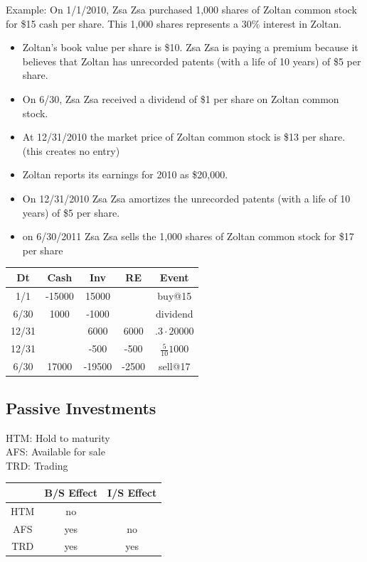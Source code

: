 Example: On 1/1/2010, Zsa Zsa purchased 1,000 shares of Zoltan common stock for \$15
cash per share. This 1,000 shares represents a 30\% interest in Zoltan.
\begin{itemize}[noitemsep,topsep=0pt]
\item Zoltan’s book value per share is \$10. Zsa Zsa is paying a premium because it believes
that Zoltan has unrecorded patents (with a life of 10 years) of \$5 per share.
\item On 6/30, Zsa Zsa received a dividend of \$1 per share on Zoltan common stock.
\item At 12/31/2010 the market price of Zoltan common stock is \$13 per share. (this creates no entry)
\item Zoltan reports its earnings for 2010 as \$20,000.
\item On 12/31/2010 Zsa Zsa amortizes the unrecorded patents (with a life of 10 years) of \$5 per share.
\item on 6/30/2011 Zsa Zsa sells the 1,000 shares of Zoltan common stock for \$17 per share

\end{itemize} 

\newpage

	\begin{tabular}{ |c|c|c||c||c| } 
		\hline
		Dt &  Cash & Inv & RE & Event	 \\ 
		\hline
		1/1   & -15000 & 15000 & & buy@15\\
		6/30  & 1000    & -1000 & & dividend \\
		12/31 &         & 6000  & 6000 & $.3 \cdot 20000$\\ 
		12/31 &         & -500  & -500 & $\frac{5}{10}  1000$ \\    
		6/30 &   17000      & -19500  & -2500 & sell@17 \\      	
		\hline
	\end{tabular}



\subsection*{Passive Investments}

HTM: Hold to maturity \\
AFS: Available for sale \\
TRD: Trading \\
\begin{center}
	\begin{tabular}{ |c|c|c| } 
		\hline
			  & B/S Effect & I/S Effect \\ 
		\hline
		HTM & no &  \\ 
		AFS & yes & no \\ 
		TRD & yes & yes \\ 
		\hline
	\end{tabular}
\end{center}

